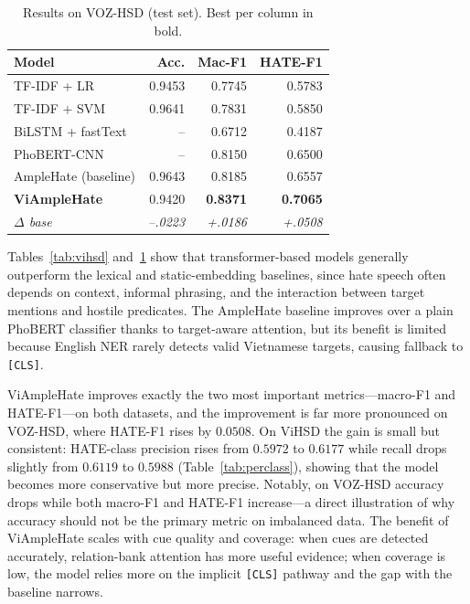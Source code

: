 \documentclass[11pt]{article}
\begin{document}
\begin{table}[t]
  \centering
  \small
  \begin{tabular}{lrrr}
    \toprule
    \textbf{Model} & \textbf{Acc.} & \textbf{Mac-F1} & \textbf{HATE-F1} \\
    \midrule
    TF-IDF + LR              & 0.9453 & 0.7745 & 0.5783 \\
    TF-IDF + SVM             & 0.9641 & 0.7831 & 0.5850 \\
    BiLSTM + fastText        & --     & 0.6712 & 0.4187 \\
    PhoBERT-CNN              & --     & 0.8150 & 0.6500 \\
    AmpleHate (baseline)     & 0.9643 & 0.8185 & 0.6557 \\
    \textbf{ViAmpleHate}     & 0.9420 & \textbf{0.8371} & \textbf{0.7065} \\
    \textit{$\Delta$ base}   & \textit{--.0223} & \textit{+.0186} & \textit{+.0508} \\
    \bottomrule
  \end{tabular}
  \caption{Results on VOZ-HSD (test set). Best per column in bold.}
  \label{tab:voz}
\end{table}

Tables~\ref{tab:vihsd} and~\ref{tab:voz} show that transformer-based models generally outperform the lexical and static-embedding baselines, since hate speech often depends on context, informal phrasing, and the interaction between target mentions and hostile predicates. The AmpleHate baseline improves over a plain PhoBERT classifier thanks to target-aware attention, but its benefit is limited because English NER rarely detects valid Vietnamese targets, causing fallback to \texttt{[CLS]}.

ViAmpleHate improves exactly the two most important metrics---macro-F1 and HATE-F1---on both datasets, and the improvement is far more pronounced on VOZ-HSD, where HATE-F1 rises by $0.0508$. On ViHSD the gain is small but consistent: HATE-class precision rises from $0.5972$ to $0.6177$ while recall drops slightly from $0.6119$ to $0.5988$ (Table~\ref{tab:perclass}), showing that the model becomes more conservative but more precise. Notably, on VOZ-HSD accuracy drops while both macro-F1 and HATE-F1 increase---a direct illustration of why accuracy should not be the primary metric on imbalanced data. The benefit of ViAmpleHate scales with cue quality and coverage: when cues are detected accurately, relation-bank attention has more useful evidence; when coverage is low, the model relies more on the implicit \texttt{[CLS]} pathway and the gap with the baseline narrows.
\end{document}
